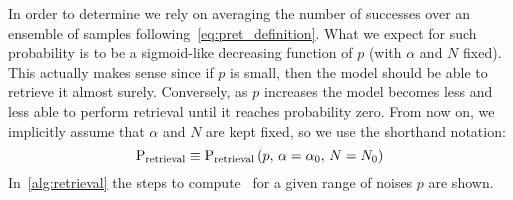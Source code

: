 \documentclass[\rootdir/main.tex]{subfiles}
\begin{document}
\begin{comment}
If we make many experiments with the same procedure we obtain that the number of successes obeys to a Binomial distribution:
\begin{equation*}\label{eq:binomial_dist}
    \operatorname{Pr}(k ;\, n,\, c)=\operatorname{Pr}(X=k)=\left(\begin{array}{l}
        n \\
        k
        \end{array}\right) c^k(1-c)^{n-k},
\end{equation*}
where
\begin{equation*}
    \left(\begin{array}{l}
        n \\
        k
        \end{array}\right)=\frac{n !}{k !(n-k) !}
\end{equation*}
is the usual binomial coefficient, $k$ is the number of successes and $n$ is the number of trials.\\
The parameter that governs \cref{eq:binomial_dist} is our retrieval probability, \ie $c \rightarrow \pret{p}$.
\end{comment}
In order to determine  we rely on averaging the number of successes over an ensemble of samples following~\cref{eq:pret_definition}. What we expect for such probability is to be a sigmoid-like decreasing function of $p$ (with $\alpha$ and $N$ fixed). This actually makes sense since if $p$ is small, then the model should be able to retrieve it almost surely. Conversely, as $p$ increases the model becomes less and less able to perform retrieval until it reaches probability zero.
From now on, we implicitly assume that $\alpha$ and $N$ are kept fixed, so we use the shorthand notation:
\begin{equation}
     \mathrm{P}_{\text{retrieval}}  \equiv \mathrm{P}_{\text{retrieval}} \left(p, \, \alpha = \alpha_0, \, N = N_0  \right)
\end{equation}
In~\cref{alg:retrieval} the steps to compute \pretshort\ for a given range of noises $p$ are shown.
\end{document}
